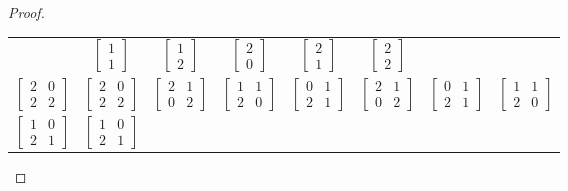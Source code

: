 \documentclass[12pt, psamsfonts]{amsart}
\theoremstyle{definition}
\theoremstyle{remark}
\numberwithin{equation}{section}
\begin{document}
\begin{proof}
\begin{enumerate}
\begin{center}
\begin{tabular}{|c|c|c|c|c|c|c|c|}
          & $\begin{bmatrix} 1 \\ 1 \end{bmatrix}$
          & $\begin{bmatrix} 1 \\ 2 \end{bmatrix}$
          & $\begin{bmatrix} 2 \\ 0 \end{bmatrix}$
          & $\begin{bmatrix} 2 \\ 1 \end{bmatrix}$
          & $\begin{bmatrix} 2 \\ 2 \end{bmatrix}$ \\
          $\begin{bmatrix} 2 & 0 \\ 2 & 2 \end{bmatrix}$
          & $\begin{bmatrix} 2 & 0 \\ 2 & 2 \end{bmatrix}$
          & $\begin{bmatrix} 2 & 1 \\ 0 & 2 \end{bmatrix}$
          & $\begin{bmatrix} 1 & 1 \\ 2 & 0 \end{bmatrix}$
          & $\begin{bmatrix} 0 & 1 \\ 2 & 1 \end{bmatrix}$
          & $\begin{bmatrix} 2 & 1 \\ 0 & 2 \end{bmatrix}$
          & $\begin{bmatrix} 0 & 1 \\ 2 & 1 \end{bmatrix}$
          & $\begin{bmatrix} 1 & 1 \\ 2 & 0 \end{bmatrix}$ \\
          $\begin{bmatrix} 1 & 0 \\ 2 & 1 \end{bmatrix}$
          & $\begin{bmatrix} 1 & 0 \\ 2 & 1 \end{bmatrix}$

\end{tabular}
\end{center}
\end{enumerate}
\end{proof}
\end{document}
